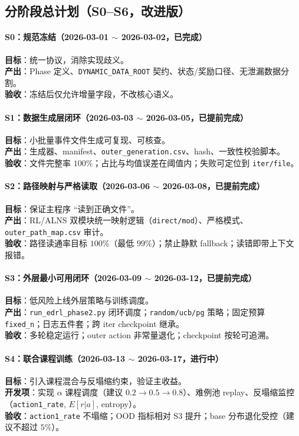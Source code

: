 \documentclass[UTF8,11pt,a4paper]{ctexart}
\begin{document}
\subsection{分阶段总计划（S0--S6，改进版）}
\paragraph{S0：规范冻结（2026-03-01 $\sim$ 2026-03-02，已完成）}
\textbf{目标}：统一协议，消除实现歧义。\\
\textbf{产出}：Phase 定义、\texttt{DYNAMIC\_DATA\_ROOT} 契约、状态/奖励口径、无泄漏数据分割。\\
\textbf{验收}：冻结后仅允许增量字段，不改核心语义。

\paragraph{S1：数据生成层闭环（2026-03-03 $\sim$ 2026-03-05，已提前完成）}
\textbf{目标}：小批量事件文件生成可复现、可核查。\\
\textbf{产出}：生成器、manifest、\texttt{outer\_generation.csv}、hash、一致性校验脚本。\\
\textbf{验收}：文件完整率 $100\%$；占比与均值误差在阈值内；失败可定位到 \texttt{iter/file}。

\paragraph{S2：路径映射与严格读取（2026-03-06 $\sim$ 2026-03-08，已提前完成）}
\textbf{目标}：保证主程序 ``读到正确文件''。\\
\textbf{产出}：RL/ALNS 双模块统一映射逻辑（\texttt{direct/mod}）、严格模式、\texttt{outer\_path\_map.csv} 审计。\\
\textbf{验收}：路径读通率目标 $100\%$（最低 $99\%$）；禁止静默 fallback；读错即带上下文报错。

\paragraph{S3：外层最小可用闭环（2026-03-09 $\sim$ 2026-03-12，已提前完成）}
\textbf{目标}：低风险上线外层策略与训练调度。\\
\textbf{产出}：\texttt{run\_edrl\_phase2.py} 闭环调度；\texttt{random/ucb/pg} 策略；固定预算 \texttt{fixed\_n}；日志五件套；跨 iter checkpoint 继承。\\
\textbf{验收}：多轮稳定运行；outer action 非常量退化；checkpoint 按轮可追溯。

\paragraph{S4：联合课程训练（2026-03-13 $\sim$ 2026-03-17，进行中）}
\textbf{目标}：引入课程混合与反塌缩约束，验证主收益。\\
\textbf{开发项}：实现 $\alpha$ 课程调度（建议 $0.2\rightarrow0.5\rightarrow0.8$）、难例池 replay、反塌缩监控（\texttt{action1\_rate}, $E[r|a]$, entropy）。\\
\textbf{验收}：\texttt{action1\_rate} 不塌缩；OOD 指标相对 S3 提升；base 分布退化受控（建议不超过 $5\%$）。
\end{document}
